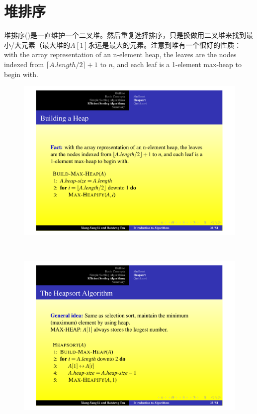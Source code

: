 \documentclass[]{report}
\begin{document}
	\section{堆排序}
		堆排序({})是一直维护一个二叉堆。然后重复选择排序，只是换做用二叉堆来找到最小/大元素（最大堆的$A[1]$永远是最大的元素。注意到堆有一个很好的性质：with the array representation of an n-element heap, the leaves are the nodes indexed from $\lceil A.length/2\rceil + 1$ to $n$, and each leaf is a 1-element max-heap to begin with.
		\begin{figure}[h!]
			\centering
			\begin{minipage}{20em}
				\centering
				\begin{minipage}{20em}
					\centering
					\includegraphics[scale = 0.25]{images/Build_Max_Heap.pdf}
				\end{minipage}\\[10pt]
				\begin{minipage}{20em}
					\centering
					\includegraphics[scale = 0.25]{images/HeapSort.pdf}

\end{minipage}
\end{minipage}
\end{figure}
\end{document}
